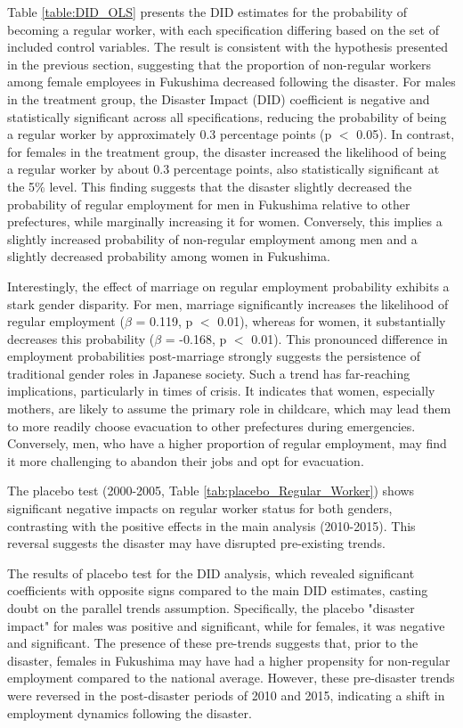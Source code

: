 \documentclass[a4paper,12pt]{article}
\begin{document}
Table \ref{table:DID_OLS} presents the DID estimates for the probability of becoming a regular worker, with each specification differing based on the set of included control variables. The result is consistent with the hypothesis presented in the previous section, suggesting that the proportion of non-regular workers among female employees in Fukushima decreased following the disaster. For males in the treatment group, the Disaster Impact (DID) coefficient is negative and statistically significant across all specifications, reducing the probability of being a regular worker by approximately 0.3 percentage points (p $<$ 0.05). In contrast, for females in the treatment group, the disaster increased the likelihood of being a regular worker by about 0.3 percentage points, also statistically significant at the 5\% level. This finding suggests that the disaster slightly decreased the probability of regular employment for men in Fukushima relative to other prefectures, while marginally increasing it for women. Conversely, this implies a slightly increased probability of non-regular employment among men and a slightly decreased probability among women in Fukushima.

Interestingly, the effect of marriage on regular employment probability exhibits a stark gender disparity. For men, marriage significantly increases the likelihood of regular employment ($\beta$ = 0.119, p $<$ 0.01), whereas for women, it substantially decreases this probability ($\beta$ = -0.168, p $<$ 0.01). This pronounced difference in employment probabilities post-marriage strongly suggests the persistence of traditional gender roles in Japanese society. Such a trend has far-reaching implications, particularly in times of crisis. It indicates that women, especially mothers, are likely to assume the primary role in childcare, which may lead them to more readily choose evacuation to other prefectures during emergencies. Conversely, men, who have a higher proportion of regular employment, may find it more challenging to abandon their jobs and opt for evacuation.


The placebo test (2000-2005, Table \ref{tab:placebo_Regular_Worker}) shows significant negative impacts on regular worker status for both genders, contrasting with the positive effects in the main analysis (2010-2015). This reversal suggests the disaster may have disrupted pre-existing trends.


The results of placebo test for the DID analysis, which revealed significant coefficients with opposite signs compared to the main DID estimates, casting doubt on the parallel trends assumption. Specifically, the placebo "disaster impact" for males was positive and significant, while for females, it was negative and significant. The presence of these pre-trends suggests that, prior to the disaster, females in Fukushima may have had a higher propensity for non-regular employment compared to the national average. However, these pre-disaster trends were reversed in the post-disaster periods of 2010 and 2015, indicating a shift in employment dynamics following the disaster. 
\end{document}

